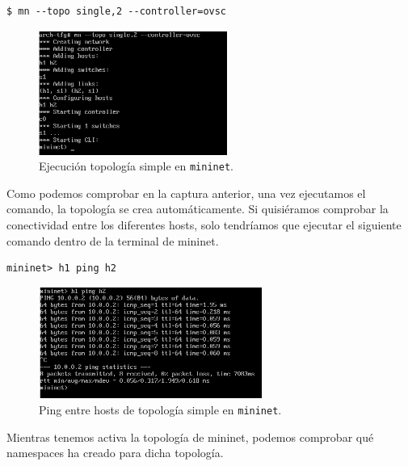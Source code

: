 \documentclass[a4paper, oneside, 12pt]{book}
\begin{document}
	\begin{verbatim}
$ mn --topo single,2 --controller=ovsc
	\end{verbatim}

	\begin{figure}[h!]
		\begin{center}
			\includegraphics[width=0.55\textwidth]{img/mn_single_1.png}
			\caption{Ejecución topología simple en \texttt{mininet}.}
		\end{center}
	\end{figure}

	\pagebreak
	
	\noindent Como podemos comprobar en la captura anterior, una vez ejecutamos el comando, la topología se crea automáticamente. Si quisiéramos comprobar la conectividad entre los diferentes hosts, solo tendríamos que ejecutar el siguiente comando dentro de la terminal de mininet.
	
	\begin{verbatim}
mininet> h1 ping h2
	\end{verbatim}

	\begin{figure}[h!]
		\begin{center}
			\includegraphics[width=0.65\textwidth]{img/mn_single_2.png}
			\caption{Ping entre hosts de topología simple en \texttt{mininet}.}
			\label{img: ping mn simple}
		\end{center}
	\end{figure}
	
	\noindent Mientras tenemos activa la topología de mininet, podemos comprobar qué namespaces ha creado para dicha topología. 
	
\end{document}
